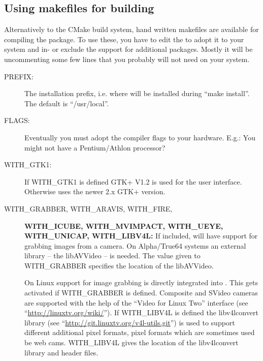 \subsection{Using makefiles for \icewing{} building}

Alternatively to the CMake build system, hand written makefiles are
available for compiling the \icewing{} package. To use these, you have
to edit the  to adopt it to your system and in- or
exclude the support for additional packages. Mostly it will be
uncommenting some few lines that you probably will not need on your
system.

\begin{description}

\item[PREFIX:]
  The installation prefix, i.e. where \icewing{} will be
  installed during ``make install''. The default is ``/usr/local''.

\item[FLAGS:]
  Eventually you must adopt the compiler flags to your
  hardware. E.g.: You might not have a Pentium/Athlon processor?

\item[WITH\_GTK1:]
  If WITH\_GTK1 is defined GTK+ V1.2 is used for the user
  interface. Otherwise \icewing{} uses the newer 2.x GTK+ version.

\item[WITH\_GRABBER, WITH\_ARAVIS, WITH\_FIRE,]
  \textsf{\textbf{WITH\_ICUBE, WITH\_MVIMPACT, WITH\_UEYE,
      WITH\_UNICAP, WITH\_LIBV4L:}}
  If included, \icewing{} will have support for grabbing images from
  a camera. On Alpha/True64 systems an external library -- the
  libAVVideo -- is needed. The value given to WITH\_GRABBER
  specifies the location of the libAVVideo.

  On Linux support for image grabbing is directly integrated into
  \icewing{}. This gets activated if WITH\_GRABBER is
  defined. Composite and SVideo cameras are supported with the help
  of the ``Video for Linux Two'' interface (see
  ``\url{http://linuxtv.org/wiki/}''). If WITH\_LIBV4L is defined
  the libv4lconvert library (see
  ``\url{http://git.linuxtv.org/v4l-utils.git}'') is used to support
  different additional pixel formats, pixel formats which are
  sometimes used be web cams. WITH\_LIBV4L gives the location of the
  libv4lconvert library and header files.


\end{description}
